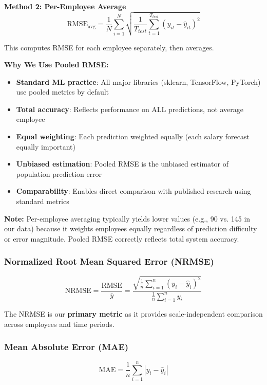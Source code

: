 \documentclass[12pt,a4paper]{article}
\begin{document}
\textbf{Method 2: Per-Employee Average}
\begin{equation}
\text{RMSE}_{\text{avg}} = \frac{1}{N}\sum_{i=1}^{N}\sqrt{\frac{1}{T_{test}}\sum_{t=1}^{T_{test}}(y_{it} - \hat{y}_{it})^2}
\end{equation}

This computes RMSE for each employee separately, then averages.

\textbf{Why We Use Pooled RMSE:}
\begin{itemize}
    \item \textbf{Standard ML practice}: All major libraries (sklearn, TensorFlow, PyTorch) use pooled metrics by default
    \item \textbf{Total accuracy}: Reflects performance on ALL predictions, not average employee
    \item \textbf{Equal weighting}: Each prediction weighted equally (each salary forecast equally important)
    \item \textbf{Unbiased estimation}: Pooled RMSE is the unbiased estimator of population prediction error
    \item \textbf{Comparability}: Enables direct comparison with published research using standard metrics
\end{itemize}

\textbf{Note:} Per-employee averaging typically yields lower values (e.g., 90 vs. 145 in our data) because it weights employees equally regardless of prediction difficulty or error magnitude. Pooled RMSE correctly reflects total system accuracy.

\subsubsection{Normalized Root Mean Squared Error (NRMSE)}
\begin{equation}
\text{NRMSE} = \frac{\text{RMSE}}{\bar{y}} = \frac{\sqrt{\frac{1}{n}\sum_{i=1}^{n}(y_i - \hat{y}_i)^2}}{\frac{1}{n}\sum_{i=1}^{n}y_i}
\end{equation}

The NRMSE is our \textbf{primary metric} as it provides scale-independent comparison across employees and time periods.

\subsubsection{Mean Absolute Error (MAE)}
\begin{equation}
\text{MAE} = \frac{1}{n}\sum_{i=1}^{n}|y_i - \hat{y}_i|
\end{equation}
\end{document}
